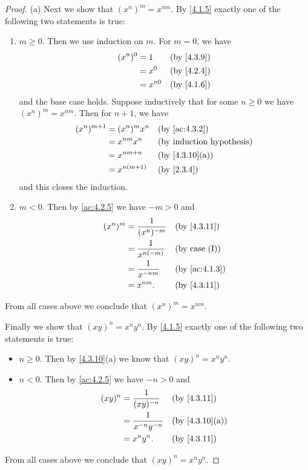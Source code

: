 \begin{proof}{(a)}
  Next we show that \((x^n)^m = x^{nm}\).
  By \cref{4.1.5} exactly one of the following two statements is true:
  \begin{enumerate}[label=(\Roman*)]
    \item \(m \geq 0\).
          Then we use induction on \(m\).
          For \(m = 0\), we have
          \begin{align*}
            (x^n)^0 & = 1      &  & \by{4.3.9} \\
                    & = x^0    &  & \by{4.2.4} \\
                    & = x^{n0} &  & \by{4.1.6}
          \end{align*}
          and the base case holds.
          Suppose inductively that for some \(n \geq 0\) we have \((x^n)^m = x^{nm}\).
          Then for \(n + 1\), we have
          \begin{align*}
            (x^n)^{m + 1} & = (x^n)^m x^n  &  & \by{ac:4.3.2}                \\
                          & = x^{nm} x^n   &  & \byIH                        \\
                          & = x^{nm + n}   &  & \text{(by \cref{4.3.10}(a))} \\
                          & = x^{n(m + 1)} &  & \by{2.3.4}
          \end{align*}
          and this closes the induction.
    \item \(m < 0\).
          Then by \cref{ac:4.2.5} we have \(-m > 0\) and
          \begin{align*}
            (x^n)^m & = \dfrac{1}{(x^n)^{-m}} &  & \by{4.3.11}          \\
                    & = \dfrac{1}{x^{n(-m)}}  &  & \text{(by case (I))} \\
                    & = \dfrac{1}{x^{-nm}}    &  & \by{ac:4.1.3}        \\
                    & = x^{nm}.               &  & \by{4.3.11}
          \end{align*}
  \end{enumerate}
  From all cases above we conclude that \((x^n)^m = x^{nm}\).

  Finally we show that \((xy)^n = x^n y^n\).
  By \cref{4.1.5} exactly one of the following two statements is true:
  \begin{itemize}
    \item \(n \geq 0\).
          Then by \cref{4.3.10}(a) we know that \((xy)^n = x^n y^n\).
    \item \(n < 0\).
          Then by \cref{ac:4.2.5} we have \(-n > 0\) and
          \begin{align*}
            (xy)^n & = \dfrac{1}{(xy)^{-n}}     &  & \by{4.3.11}                  \\
                   & = \dfrac{1}{x^{-n} y^{-n}} &  & \text{(by \cref{4.3.10}(a))} \\
                   & = x^n y^n.                 &  & \by{4.3.11}
          \end{align*}
  \end{itemize}
  From all cases above we conclude that \((xy)^n = x^n y^n\).
\end{proof}

